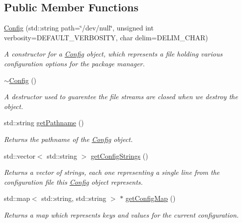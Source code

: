 \subsection*{Public Member Functions}
\begin{DoxyCompactItemize}
\item 
\mbox{\hyperlink{classConfig_ad39b82d34c5ba05e16b6440a957517e7}{Config}} (std\+::string path=\char`\"{}/dev/null\char`\"{}, unsigned int verbosity=D\+E\+F\+A\+U\+L\+T\+\_\+\+V\+E\+R\+B\+O\+S\+I\+TY, char delim=D\+E\+L\+I\+M\+\_\+\+C\+H\+AR)
\begin{DoxyCompactList}\small\item\em A constructor for a \mbox{\hyperlink{classConfig}{Config}} object, which represents a file holding various configuration options for the package manager. \end{DoxyCompactList}\item 
\mbox{\hyperlink{classConfig_a543dce59b66475c5108088ee4ce1cdfc}{$\sim$\+Config}} ()
\begin{DoxyCompactList}\small\item\em A destructor used to guarentee the file streams are closed when we destroy the object. \end{DoxyCompactList}\item 
std\+::string \mbox{\hyperlink{classConfig_a6c2d84c1fd4a4720fc7785bb9ab6bd65}{get\+Pathname}} ()
\begin{DoxyCompactList}\small\item\em Returns the pathname of the \mbox{\hyperlink{classConfig}{Config}} object. \end{DoxyCompactList}\item 
std\+::vector$<$ std\+::string $>$ \mbox{\hyperlink{classConfig_a1b377e4ec37a758532aa66dce2b2adb2}{get\+Config\+Strings}} ()
\begin{DoxyCompactList}\small\item\em Returns a vector of strings, each one representing a single line from the configuration file this \mbox{\hyperlink{classConfig}{Config}} object represents. \end{DoxyCompactList}\item 
std\+::map$<$ std\+::string, std\+::string $>$ $\ast$ \mbox{\hyperlink{classConfig_a129cacb3da610950c78f990a19d7e922}{get\+Config\+Map}} ()
\begin{DoxyCompactList}\small\item\em Returns a map which represents keys and values for the current configuration. \end{DoxyCompactList}\item 

\end{DoxyCompactItemize}
